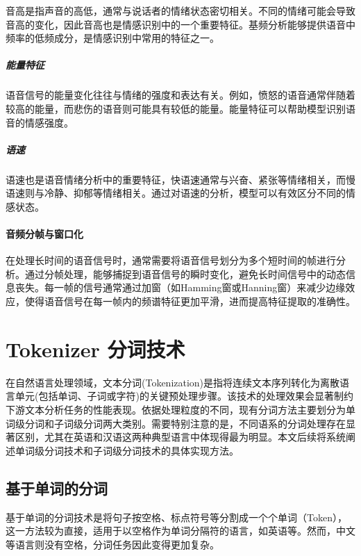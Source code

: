 音高是指声音的高低，通常与说话者的情绪状态密切相关。不同的情绪可能会导致音高的变化，因此音高也是情感识别中的一个重要特征。基频分析能够提供语音中频率的低频成分，是情感识别中常用的特征之一。

\subparagraph{能量特征}

语音信号的能量变化往往与情绪的强度和表达有关。例如，愤怒的语音通常伴随着较高的能量，而悲伤的语音则可能具有较低的能量。能量特征可以帮助模型识别语音的情感强度。

\subparagraph{语速}

语速也是语音情绪分析中的重要特征，快语速通常与兴奋、紧张等情绪相关，而慢语速则与冷静、抑郁等情绪相关。通过对语速的分析，模型可以有效区分不同的情感状态。

\paragraph{音频分帧与窗口化}

在处理长时间的语音信号时，通常需要将语音信号划分为多个短时间的帧进行分析。通过分帧处理，能够捕捉到语音信号的瞬时变化，避免长时间信号中的动态信息丧失。每一帧的信号通常通过加窗（如Hamming窗或Hanning窗）来减少边缘效应，使得语音信号在每一帧内的频谱特征更加平滑，进而提高特征提取的准确性。

\section{Tokenizer 分词技术}


在自然语言处理领域，文本分词(Tokenization)是指将连续文本序列转化为离散语言单元(包括单词、子词或字符)的关键预处理步骤。该技术的处理效果会显著制约下游文本分析任务的性能表现。依据处理粒度的不同，现有分词方法主要划分为单词级分词和子词级分词两大类别。需要特别注意的是，不同语系的分词处理存在显著区别，尤其在英语和汉语这两种典型语言中体现得最为明显。本文后续将系统阐述单词级分词技术和子词级分词技术的具体实现方法。

\subsection{基于单词的分词}

基于单词的分词技术是将句子按空格、标点符号等分割成一个个单词（Token），这一方法较为直接，适用于以空格作为单词分隔符的语言，如英语等。然而，中文等语言则没有空格，分词任务因此变得更加复杂。

